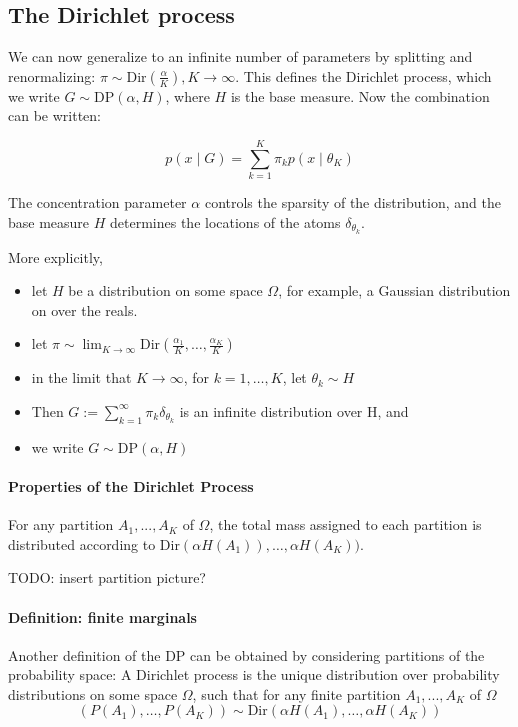\documentclass[twoside]{article}
\newcommand{\Dir}{\mathrm{Dir}}
\newcommand{\DP}{\mathrm{DP}}
\newcommand{\todo}[1]{{\color{red} TODO: #1}}
\begin{document}
\subsection{The Dirichlet process}
We can now generalize to an infinite number of parameters by splitting and renormalizing: $\pi \sim \Dir(\frac{\alpha}{K}), K \longrightarrow \infty$. This defines the Dirichlet process, which we write $G \sim \DP(\alpha, H)$, where $H$ is the base measure. Now the combination can be written:

$$ p(x \mid G) = \sum_{k=1}^K \pi_k p(x \mid \theta_K) $$

The concentration parameter $\alpha$ controls the sparsity of the distribution, and the base measure $H$ determines the locations of the atoms $\delta_{\theta_k}$.

More explicitly, 
\begin{itemize}
\item let $H$ be a distribution on some space $\Omega$, for example, a Gaussian distribution on over the reals.
\item let $\pi \sim \lim_{K \to \infty} \Dir{\left( \frac{\alpha_1}{K},\ldots,\frac{\alpha_K}{K} \right)}$
\item in the limit that $K \to \infty$, for $k = 1,\ldots,K$, let $\theta_k \sim H$
\item Then $G := \sum_{k=1}^{\infty}\pi_k \delta_{\theta_k}$ is an infinite distribution over H, and
\item we write $G \sim \DP{(\alpha,H)}$
\end{itemize}

\paragraph{Properties of the Dirichlet Process}
For any partition $A_1,...,A_K$ of $\Omega$, the total mass assigned to each partition is distributed according to $\Dir(\alpha H(A_1)),\ldots, \alpha H(A_K))$.

\todo{insert partition picture?}

\paragraph{Definition: finite marginals}
Another definition of the DP can be obtained by considering partitions of the probability space: A Dirichlet process is the unique distribution over probability distributions on some space $\Omega$, such that for any finite partition $A_1,...,A_K$ of $\Omega$
\[
\left( P(A_1),\ldots, P(A_K) \right) \sim \Dir{\left( \alpha H(A_1),\ldots, \alpha H(A_K) \right)}
\]
\end{document}
